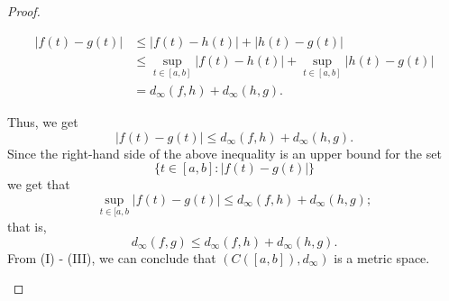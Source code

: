 \documentclass[a4paper]{article}
\begin{document}
\begin{problem}
\begin{enumerate}
\begin{proof}
\begin{enumerate}
                       \begin{align*}
                           | f(t) - g(t)  |  &\leq | f(t) - h(t) |  + | h(t) - g(t) |  \\  
                                             &\leq \sup_{t \in [a,b]}| f(t) - h(t) |  + \sup_{t \in [a,b]} | h(t) - g(t) |  \\
                                             &= {d}_{\infty}(f,h) + {d}_{\infty }(h,g).
                       \end{align*}

                       Thus, we get
                       \[  | f(t) - g(t) | \leq {d}_{\infty }(f,h) + {d}_{\infty }(h,g). \]
                       Since the right-hand side of the above inequality is an upper bound for the set 
                       \[  \{ t \in [a,b] : | f(t) - g(t) |  \} \]
                    we get that 
                    \[  \sup_{t \in [a,b}| f(t) - g(t) |  \leq {d}_{\infty }(f,h) + {d}_{\infty }(h,g);  \]
                    that is, 
                    \[  {d}_{\infty }(f,g) \leq {d}_{\infty}(f,h) + {d}_{\infty }(h,g). \]
                    From (I) - (III), we can conclude that \( (C([a,b]), {d}_{\infty })  \) is a metric space.
               \end{enumerate}
           \end{proof}
   \end{enumerate}
\end{problem}
\end{document}
